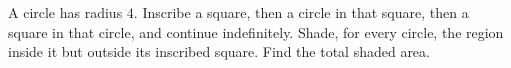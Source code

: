 A circle has radius $4$. Inscribe a square, then a circle in that square, then a square in that circle, and continue indefinitely. Shade, for every circle, the region inside it but outside its inscribed square. Find the total shaded area.

